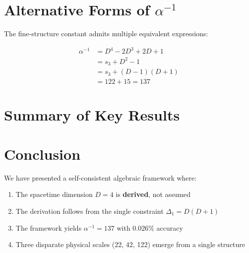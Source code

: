 \documentclass[12pt,a4paper]{article}
\begin{document}
\section{Alternative Forms of $\alpha^{-1}$}

The fine-structure constant admits multiple equivalent expressions:

\begin{align*}
\alpha^{-1} &= D^4 - 2D^3 + 2D + 1 \\
&= s_3 + D^2 - 1 \\
&= s_3 + (D-1)(D+1) \\
&= 122 + 15 = 137
\end{align*}

\section{Summary of Key Results}

\begin{center}
\end{center}

\section{Conclusion}

We have presented a self-consistent algebraic framework where:

\begin{enumerate}
\item The spacetime dimension $D = 4$ is \textbf{derived}, not assumed
\item The derivation follows from the single constraint $\Delta_1 = D(D+1)$
\item The framework yields $\alpha^{-1} = 137$ with $0.026\%$ accuracy
\item Three disparate physical scales (22, 42, 122) emerge from a single structure
\end{enumerate}
\end{document}

